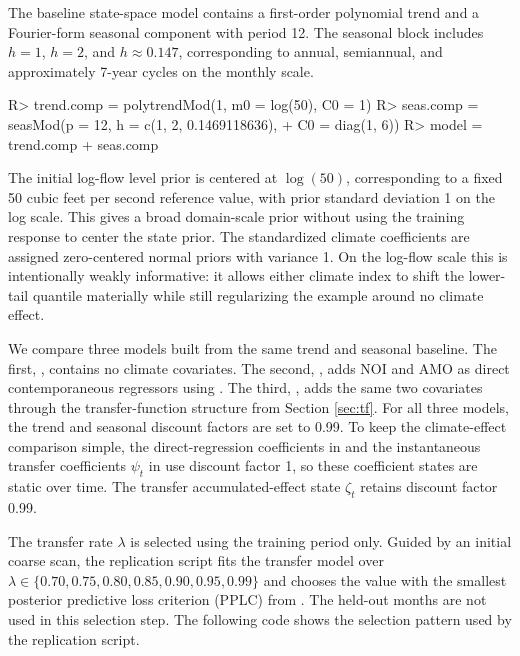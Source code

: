 \documentclass{jss}
\begin{document}
The baseline state-space model contains a first-order polynomial trend and a Fourier-form seasonal component with period 12. The seasonal block includes \(h = 1\), \(h = 2\), and \(h \approx 0.147\), corresponding to annual, semiannual, and approximately 7-year cycles on the monthly scale.
\begin{CodeChunk}
\begin{CodeInput}
R> trend.comp = polytrendMod(1, m0 = log(50), C0 = 1)
R> seas.comp = seasMod(p = 12, h = c(1, 2, 0.1469118636),
+                     C0 = diag(1, 6))
R> model = trend.comp + seas.comp
\end{CodeInput}
\end{CodeChunk}
The initial log-flow level prior is centered at \(\log(50)\), corresponding to
a fixed 50 cubic feet per second reference value, with prior standard deviation
1 on the log scale. This gives a broad domain-scale prior without using the
training response to center the state prior. The standardized climate coefficients are assigned zero-centered normal priors
with variance 1. On the log-flow scale this is intentionally weakly informative:
it allows either climate index to shift the lower-tail quantile materially while
still regularizing the example around no climate effect.

We compare three models built from the same trend and seasonal baseline. The
first, , contains no climate covariates. The second, , adds
NOI and AMO as direct contemporaneous regressors using . The
third, , adds the same two covariates through the transfer-function
structure from Section \ref{sec:tf}. For all three models, the trend and
seasonal discount factors are set to 0.99. To keep the climate-effect
comparison simple, the direct-regression coefficients in  and the
instantaneous transfer coefficients \(\psi_t\) in  use discount
factor 1, so these coefficient states are static over time. The transfer
accumulated-effect state \(\zeta_t\) retains discount factor 0.99.

The transfer rate \(\lambda\) is selected using the training period only. Guided
by an initial coarse scan, the replication script fits the transfer model over
\(\lambda\in\{0.70,0.75,0.80,0.85,0.90,0.95,0.99\}\) and chooses the value with
the smallest posterior predictive loss criterion (PPLC) from
. The held-out months are not used in this selection
step. The following code shows the selection pattern used by the replication
script.
\end{document}
